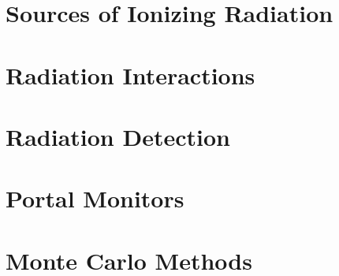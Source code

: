 \section{Sources of Ionizing Radiation}\label{toc:s:intro.sourceOfIonizingRatiation}

\newpage
\section{Radiation Interactions}\label{toc:s:intro.radInteractions}

\newpage
\section{Radiation Detection}\label{toc:s:intro.radDetection}

\newpage
\section{Portal Monitors}\label{toc:s:intro.portalMonitors}

\newpage
\section{Monte Carlo Methods}\label{toc:s:intro.monteCarlo}
